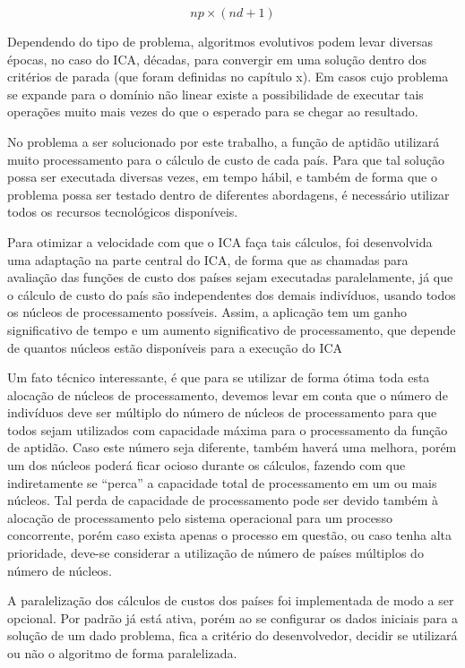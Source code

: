 \begin{equation}
\label{eq:quantidade de chamadas fitness}
np \times (nd + 1)
\end{equation}


Dependendo do tipo de problema, algoritmos evolutivos podem levar diversas épocas, no caso do ICA, décadas, para convergir em uma solução dentro dos critérios de parada (que foram definidas no capítulo x). Em casos cujo problema se expande para o domínio não linear existe a possibilidade de executar tais operações muito mais vezes do que o esperado para se chegar ao resultado. 


No problema a ser solucionado por este trabalho, a função de aptidão utilizará muito processamento para o cálculo de custo de cada país. Para que tal solução possa ser executada diversas vezes, em tempo hábil, e também de forma que o problema possa ser testado dentro de diferentes abordagens, é necessário utilizar todos os recursos tecnológicos disponíveis. 


Para otimizar a velocidade com que o ICA faça tais cálculos, foi desenvolvida uma adaptação na parte central do ICA, de forma que as chamadas para avaliação das funções de custo dos países sejam executadas paralelamente, já que o cálculo de custo do país são independentes dos demais indivíduos, usando todos os núcleos de processamento possíveis. Assim, a aplicação tem um ganho significativo de tempo e um aumento significativo de processamento, que depende de quantos núcleos estão disponíveis para a execução do ICA


Um fato técnico interessante, é que para se utilizar de forma ótima toda esta alocação de núcleos de processamento, devemos levar em conta que o número de indivíduos deve ser múltiplo do número de núcleos de processamento para que todos sejam utilizados com capacidade máxima para o processamento da função de aptidão. Caso este número seja diferente, também haverá uma melhora, porém um dos núcleos poderá ficar ocioso durante os cálculos, fazendo com que indiretamente se “perca” a capacidade total de processamento em um ou mais núcleos. Tal perda de capacidade de processamento pode ser devido também à alocação de processamento pelo sistema operacional para um processo concorrente, porém caso exista apenas o processo em questão, ou caso tenha alta prioridade, deve-se considerar a utilização de número de países múltiplos do número de núcleos.


A paralelização dos cálculos de custos dos países foi implementada de modo a ser opcional. Por padrão já está ativa, porém ao se configurar os dados iniciais para a solução de um dado problema, fica a critério do desenvolvedor, decidir se utilizará ou não o algoritmo de forma paralelizada.


